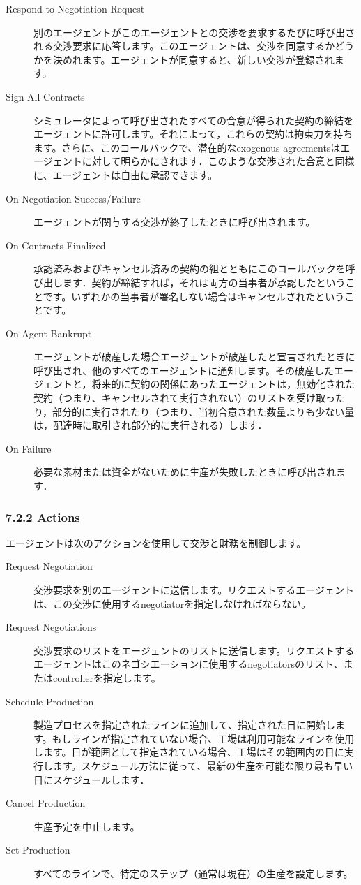 \documentclass[12pt]{jarticle}
\begin{document}
\begin{description}
  \item[Respond to Negotiation Request] 別のエージェントがこのエージェントとの交渉を要求するたびに呼び出される交渉要求に応答します。このエージェントは、交渉を同意するかどうかを決めれます。エージェントが同意すると、新しい交渉が登録されます。
  \item[Sign All Contracts] シミュレータによって呼び出されたすべての合意が得られた契約の締結をエージェントに許可します。それによって，これらの契約は拘束力を持ちます。さらに、このコールバックで、潜在的なexogenous agreementsはエージェントに対して明らかにされます．このような交渉された合意と同様に、エージェントは自由に承認できます。
  \item[On Negotiation Success/Failure] エージェントが関与する交渉が終了したときに呼び出されます。
  \item[On Contracts Finalized] 承認済みおよびキャンセル済みの契約の組とともにこのコールバックを呼び出します．契約が締結すれば，それは両方の当事者が承認したということです。いずれかの当事者が署名しない場合はキャンセルされたということです。
  \item[On Agent Bankrupt] エージェントが破産した場合エージェントが破産したと宣言されたときに呼び出され、他のすべてのエージェントに通知します。その破産したエージェントと，将来的に契約の関係にあったエージェントは，無効化された契約（つまり、キャンセルされて実行されない）のリストを受け取ったり，部分的に実行されたり（つまり、当初合意された数量よりも少ない量は，配達時に取引され部分的に実行される）します．
  \item[On Failure] 必要な素材または資金がないために生産が失敗したときに呼び出されます．
\end{description} 

\subsubsection{7.2.2 Actions}
エージェントは次のアクションを使用して交渉と財務を制御します。

\begin{description}
  \item[Request Negotiation] 交渉要求を別のエージェントに送信します。リクエストするエージェントは、この交渉に使用するnegotiatorを指定しなければならない。
  \item[Request Negotiations] 交渉要求のリストをエージェントのリストに送信します。リクエストするエージェントはこのネゴシエーションに使用するnegotiatorsのリスト、またはcontrollerを指定します。
  \item[Schedule Production] 製造プロセスを指定されたラインに追加して、指定された日に開始します。もしラインが指定されていない場合、工場は利用可能なラインを使用します。日が範囲として指定されている場合、工場はその範囲内の日に実行します。スケジュール方法に従って、最新の生産を可能な限り最も早い日にスケジュールします．
  \item[Cancel Production] 生産予定を中止します。
  \item[Set Production] すべてのラインで、特定のステップ（通常は現在）の生産を設定します。
\end{description} 
\end{document}

